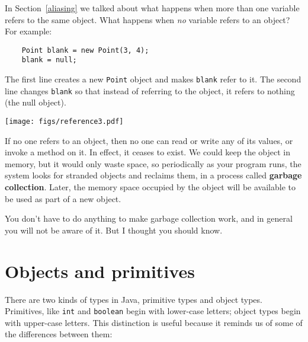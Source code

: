 \documentclass[12pt]{book}
\theoremstyle{definition}
\begin{document}
In Section~\ref{aliasing} we talked about what happens when
more than one variable refers to the same object.  What happens
when {\em no} variable refers to an object?  For example:

\begin{lstlisting}
    Point blank = new Point(3, 4);
    blank = null;
\end{lstlisting}
%
The first line creates a new {\tt Point} object and makes
{\tt blank} refer to it.  The second line changes {\tt blank}
so that instead of referring to the object, it refers to
nothing (the null object).


\texttt{[image: figs/reference3.pdf]}


If no one refers to an object, then no one can read or write any of
its values, or invoke a method on it.  In effect, it ceases to exist.
We could keep the object in memory, but it would only waste space, so
periodically as your program runs, the system looks for stranded
objects and reclaims them, in a process called {\bf garbage
collection}.  Later, the memory space occupied by the object will
be available to be used as part of a new object.

You don't have to do anything to make garbage collection work,
and in general you will not be aware of it.  But I thought you
should know.


\section {Objects and primitives}

There are two kinds of types in Java, primitive types and
object types.  Primitives, like {\tt int} and {\tt boolean}
begin with lower-case letters; object types begin with
upper-case letters.  This distinction is useful because it
reminds us of some of the differences between them:
\end{document}
